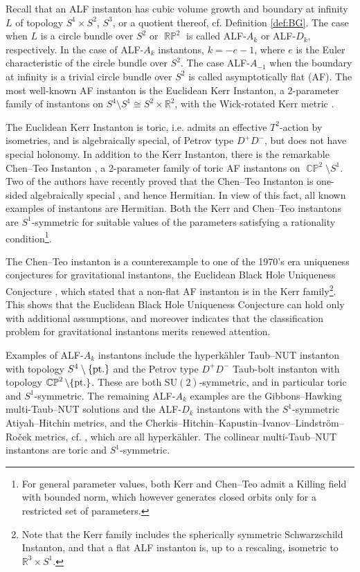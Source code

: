 \documentclass[a4paper,10pt,reqno]{amsart}
\newcommand{\Reals}{\mathbb{R}}
\theoremstyle{plain}
\DeclareMathOperator{\CP}{\mathbb{C}\mathbb{P}}
\DeclareMathOperator{\RP}{\mathbb{R}\mathbb{P}}
\newcommand{\SU}{\text{SU}}
\numberwithin{equation}{section}
\begin{document}
%

Recall that an ALF instanton has cubic volume growth and boundary at infinity $L$ of topology $S^1\times S^2$, $S^3$, or a quotient thereof, cf. Definition \ref{def:BG}. The case when $L$ is a circle bundle over $S^2$ or $\RP^2$ is called ALF-$A_k$ or ALF-$D_k$, respectively. %
In the case of  ALF-$A_k$ instantons, $k = - e -1$, where $e$ is the Euler characteristic of the circle bundle over $S^2$.
The case ALF-$A_{-1}$ when the boundary at infinity is a trivial circle bundle over $S^2$ is called asymptotically flat (AF). 
%
The most well-known AF instanton is the Euclidean Kerr Instanton, a 2-parameter family of instantons on  $S^4 \setminus S^1 \cong S^2 \times \Reals^2$, with the Wick-rotated  Kerr metric \cite{1977PhRvD..15.2752G,1978RSPSA.358..467G,1998PhRvD..59b4009H}. 

The Euclidean Kerr Instanton is toric, i.e. admits an effective $T^2$-action by isometries, and is algebraically special, of Petrov type $D^+D^-$, but does not have special holonomy.   
%
In addition to the Kerr Instanton, there is the remarkable Chen--Teo Instanton \cite{2011PhLB..703..359C}, a 2-parameter family of toric AF instantons on $\CP^2 \setminus S^1$. %
Two of the authors have recently proved that the Chen--Teo Instanton is one-sided algebraically special \cite{aksteiner2021gravitational}, and hence Hermitian. In view of this fact, all known examples of instantons are Hermitian. Both the  Kerr and Chen--Teo instantons are $S^1$-symmetric for suitable values of the parameters satisfying a rationality condition\footnote{For general parameter values, both Kerr and Chen--Teo admit a Killing field with bounded norm, which however generates closed orbits only for a restricted set of parameters.}. 

The Chen--Teo instanton is a counterexample to one of the 1970's era uniqueness conjectures for gravitational instantons, the Euclidean Black Hole Uniqueness Conjecture \cite[Conjecture 2]{gibbons:1978:survey}, which stated that a non-flat AF instanton is in the Kerr family\footnote{Note that the Kerr family includes the spherically symmetric Schwarzschild Instanton, and that a flat ALF instanton is, up to a rescaling,  isometric to $\Reals^3 \times S^1$.}. This shows that the Euclidean Black Hole Uniqueness Conjecture can hold only with additional assumptions, and moreover indicates that the classification problem for gravitational instantons merits renewed attention. 


Examples of ALF-$A_k$ instantons include the hyperk\"ahler Taub--NUT instanton \cite{hawking:1977:grav:instantons,lebrun:1989} with topology $S^4 \setminus \{\text{\rm pt.}\}$ and the Petrov type $D^+D^-$ Taub-bolt instanton \cite{1978PhLB...78..249P} with topology $\CP^2 \setminus \{\text{\rm pt.}\}$. These are both $\SU(2)$-symmetric, and in particular toric and $S^1$-symmetric. The remaining ALF-$A_k$ examples are the   
Gibbons--Hawking multi-Taub--NUT solutions and the ALF-$D_k$ instantons with the $S^1$-symmetric Atiyah--Hitchin metrics, and the  
Cherkis--Hitchin--Kapus\-tin--Ivanov--Lindstr\"om--Ro\v{c}ek metrics, cf. \cite{MR2177322,chen2019gravitational}, 
%
which are all hyperkähler.
The collinear multi-Taub--NUT instantons are toric and $S^1$-symmetric. 
\end{document}
